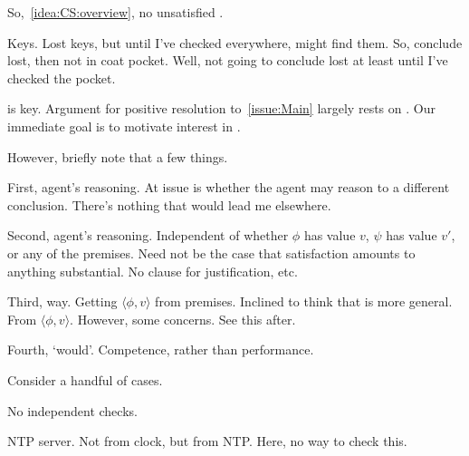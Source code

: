 \begin{note}[\requ{3}]
  So,~\autoref{idea:CS:overview}, no unsatisfied .

  Keys.
  Lost keys, but until I've checked everywhere, might find them.
  So, conclude lost, then not in coat pocket.
  Well, not going to conclude lost at least until I've checked the pocket.
\end{note}

\begin{note}
  \csN{} is key.
  Argument for positive resolution to~\autoref{issue:Main} largely rests on \csN{}.
  Our immediate goal is to motivate interest in \csN{}.

  However, briefly note that a few things.

  First, agent's reasoning.
  At issue is whether the agent may reason to a different conclusion.
  There's nothing that would lead me elsewhere.

  Second, agent's reasoning.
  Independent of whether \(\phi\) has value \(v\), \(\psi\) has value \(v'\), or any of the premises.
  Need not be the case that satisfaction amounts to anything substantial.
  No clause for justification, etc.

  Third, way.
  Getting \(\langle \phi, v \rangle\) from premises.
  Inclined to think that \csN{} is more general.
  From \(\langle \phi, v \rangle\).
  However, some concerns.
  See this after.

  Fourth, `would'.
  Competence, rather than performance.
\end{note}

\begin{note}
  Consider a handful of cases.
\end{note}

\begin{note}[Trivial]
  No independent checks.
\end{note}

\begin{note}[Pruning]
  NTP server.
  Not from clock, but from NTP.
  Here, no way to check this.
\end{note}


